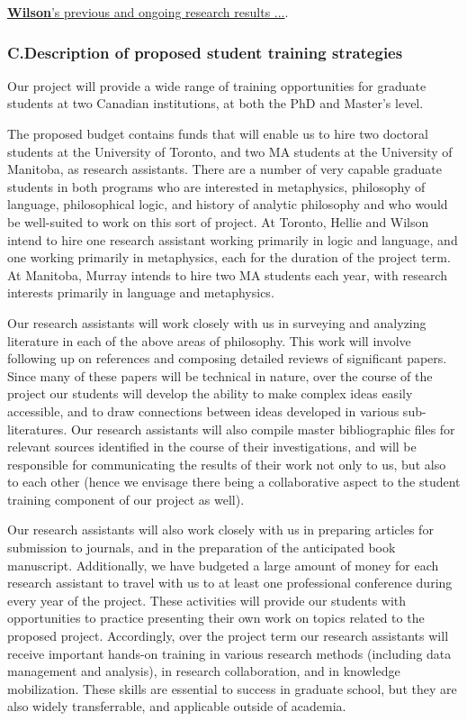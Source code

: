 \documentclass[12pt]{article}
\begin{document}
\ul{\textbf{Wilson}'s previous and ongoing research results ...}.  



\subsubsection*{C.\quad Description of proposed student training strategies}

Our project will provide a wide range of training opportunities for graduate students
at two Canadian institutions, at both the PhD and Master's level. 

The proposed budget contains funds that will enable us to hire two doctoral
students at the University of Toronto, and two MA students at the University
of Manitoba, as research assistants. There are a number of very capable
graduate students in both programs who are interested in metaphysics,
philosophy of language, philosophical logic, and history of analytic
philosophy and who would be well-suited to work on this sort of project.  At
Toronto, Hellie and Wilson intend to hire one research assistant working
primarily in logic and language, and one working primarily in metaphysics,
each for the duration of the project term.  At Manitoba, Murray intends to
hire two MA students each year, with research interests primarily in language
and metaphysics. 

Our research assistants will work closely with us in surveying and analyzing
literature in each of the above areas of philosophy.  This work will involve
following up on references and composing detailed reviews of significant
papers. Since many of these papers will be technical in nature, over the
course of the project our students will develop the ability to make complex
ideas easily accessible, and to draw connections between ideas developed in
various sub-literatures.  Our research assistants will also compile master
bibliographic files for relevant sources identified in the course of their
investigations, and will be responsible for communicating the results of their
work not only to us, but also to each other (hence we envisage there being 
a collaborative aspect
to the student training component of our project as well). 

Our research assistants will also work closely with us in preparing articles
for submission to journals, and in the preparation of the anticipated book
manuscript. Additionally, we have budgeted a large amount of money for each
research assistant to travel with us to at least one professional conference
during every year of the project. These activities will provide our students
with opportunities to practice presenting their own work on topics related to
the proposed project. Accordingly, over the project term our research
assistants will receive important hands-on training in various research
methods (including data management and analysis), in research collaboration,
and in knowledge mobilization. These skills are essential to success in
graduate school, but they are also widely transferrable, and applicable
outside of academia. 
\end{document}
